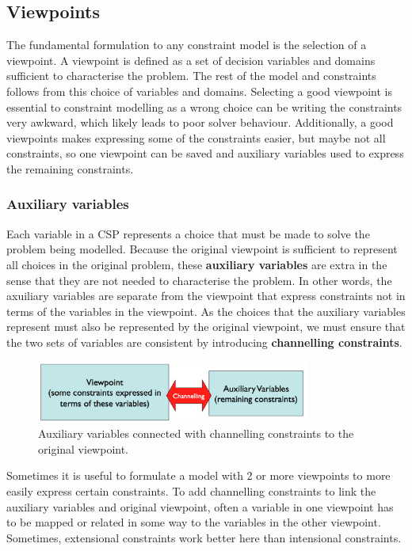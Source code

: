 \documentclass[CS4402-Notes.tex]{subfiles}
\begin{document}
\subsection{Viewpoints}
The fundamental formulation to any constraint model is the selection of a viewpoint. A viewpoint is defined as a set of decision variables and domains sufficient to characterise the problem. The rest of the model and constraints follows from this choice of variables and domains.
\n
Selecting a good viewpoint is essential to constraint modelling as a wrong choice can be writing the constraints very awkward, which likely leads to poor solver behaviour. Additionally, a good viewpoints makes expressing some of the constraints easier, but maybe not all constraints, so one viewpoint can be saved and auxiliary variables used to express the remaining constraints.

\subsubsection{Auxiliary variables}
Each variable in a CSP represents a choice that must be made to solve the problem being modelled. Because the original viewpoint is sufficient to represent all choices in the original problem, these \textbf{auxiliary variables} are extra in the sense that they are not needed to characterise the problem. In other words, the axuiliary variables are separate from the viewpoint that express constraints not in terms of the variables in the viewpoint.
\n
As the choices that the auxiliary variables represent must also be represented by the original viewpoint, we must ensure that the two sets of variables are consistent by introducing \textbf{channelling constraints}.
\begin{figure}[H]
\centering
\includegraphics[width=0.8\textwidth]{imgs/channelling-constraints.png}
\caption{Auxiliary variables connected with channelling constraints to the original viewpoint.}
\end{figure}
\noindent
Sometimes it is useful to formulate a model with 2 or more viewpoints to more easily express certain constraints. To add channelling constraints to link the auxiliary variables and original viewpoint, often a variable in one viewpoint has to be mapped or related in some way to the variables in the other viewpoint. Sometimes, extensional constraints work better here than intensional constraints.
\end{document}
